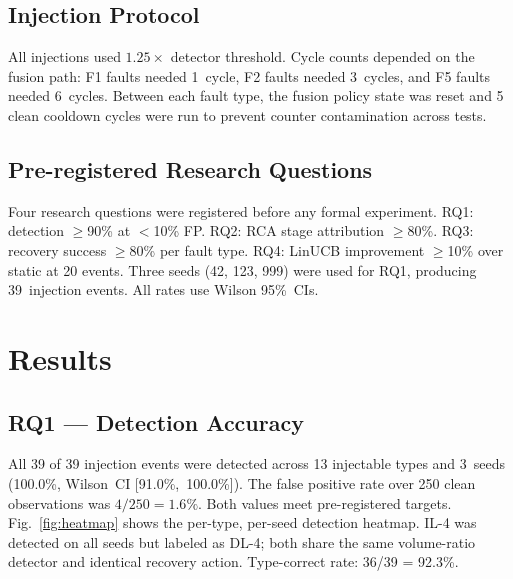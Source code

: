 \documentclass[conference]{IEEEtran}
\begin{document}
\subsection{Injection Protocol}

All injections used $1.25\times$ detector threshold. Cycle counts depended
on the fusion path: F1 faults needed 1~cycle, F2 faults needed 3~cycles,
and F5 faults needed 6~cycles. Between each fault type, the fusion policy
state was reset and 5 clean cooldown cycles were run to prevent counter
contamination across tests.

\subsection{Pre-registered Research Questions}

Four research questions were registered before any formal experiment. RQ1:
detection $\geq$90\% at $<$10\% FP. RQ2: RCA stage attribution $\geq$80\%.
RQ3: recovery success $\geq$80\% per fault type. RQ4: LinUCB improvement
$\geq$10\% over static at 20 events. Three seeds (42, 123, 999) were used
for RQ1, producing 39~injection events. All rates use Wilson 95\%~CIs.

\section{Results}

\subsection{RQ1 --- Detection Accuracy}

All 39 of 39 injection events were detected across 13 injectable types and
3~seeds (100.0\%, Wilson~CI [91.0\%,~100.0\%]). The false positive rate over
250 clean observations was $4/250 = 1.6\%$. Both values meet pre-registered
targets. Fig.~\ref{fig:heatmap} shows the per-type, per-seed detection heatmap.
IL-4 was detected on all seeds but labeled as DL-4; both share the same
volume-ratio detector and identical recovery action. Type-correct rate: 36/39
= 92.3\%.
\end{document}
